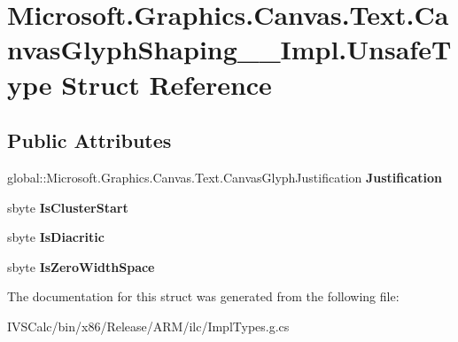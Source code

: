 \hypertarget{struct_microsoft_1_1_graphics_1_1_canvas_1_1_text_1_1_canvas_glyph_shaping_____impl_1_1_unsafe_type}{}\section{Microsoft.\+Graphics.\+Canvas.\+Text.\+Canvas\+Glyph\+Shaping\+\_\+\+\_\+\+Impl.\+Unsafe\+Type Struct Reference}
\label{struct_microsoft_1_1_graphics_1_1_canvas_1_1_text_1_1_canvas_glyph_shaping_____impl_1_1_unsafe_type}
\subsection*{Public Attributes}
\begin{DoxyCompactItemize}
\item 
\mbox{\label{struct_microsoft_1_1_graphics_1_1_canvas_1_1_text_1_1_canvas_glyph_shaping_____impl_1_1_unsafe_type_a37c6ce227901fca24ddca31cb45c9ae9}} 
global\+::\+Microsoft.\+Graphics.\+Canvas.\+Text.\+Canvas\+Glyph\+Justification {\bfseries Justification}
\item 
\mbox{\label{struct_microsoft_1_1_graphics_1_1_canvas_1_1_text_1_1_canvas_glyph_shaping_____impl_1_1_unsafe_type_a33203191cee7dd3031b8749a83c58708}} 
sbyte {\bfseries Is\+Cluster\+Start}
\item 
\mbox{\label{struct_microsoft_1_1_graphics_1_1_canvas_1_1_text_1_1_canvas_glyph_shaping_____impl_1_1_unsafe_type_a90ba2f8a9d7afe24a7f6641ce1c9bdc2}} 
sbyte {\bfseries Is\+Diacritic}
\item 
\mbox{\label{struct_microsoft_1_1_graphics_1_1_canvas_1_1_text_1_1_canvas_glyph_shaping_____impl_1_1_unsafe_type_af6cad0050dc1f0d07638ea3c287db3df}} 
sbyte {\bfseries Is\+Zero\+Width\+Space}
\end{DoxyCompactItemize}


The documentation for this struct was generated from the following file\+:\begin{DoxyCompactItemize}
\item 
I\+V\+S\+Calc/bin/x86/\+Release/\+A\+R\+M/ilc/Impl\+Types.\+g.\+cs\end{DoxyCompactItemize}
